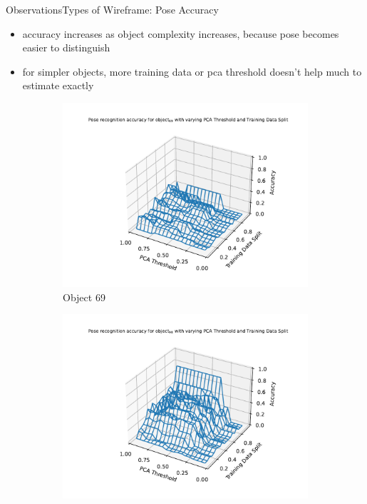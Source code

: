 \documentclass[aspectratio=169, handout, 10pt, hyperref=colorlinks]{beamer}
\begin{document}
\begin{frame}{Observations}{Types of Wireframe: Pose Accuracy}
\begin{itemize}
    \item accuracy increases as object complexity increases, because pose becomes easier to distinguish
    \item for simpler objects, more training data or pca threshold doesn't help much to estimate exactly
\end{itemize}
    \begin{figure}
        \centering
        \begin{subfigure}{0.32\linewidth}
            \centering
            \includegraphics[width=1.2\linewidth]{wireframe/pose/69.pdf}
            \caption{Object 69}
        \end{subfigure}
        \begin{subfigure}{0.32\linewidth}
            \centering
            \includegraphics[width=1.2\linewidth]{wireframe/pose/98.pdf}

\end{subfigure}
\end{figure}
\end{frame}
\end{document}
